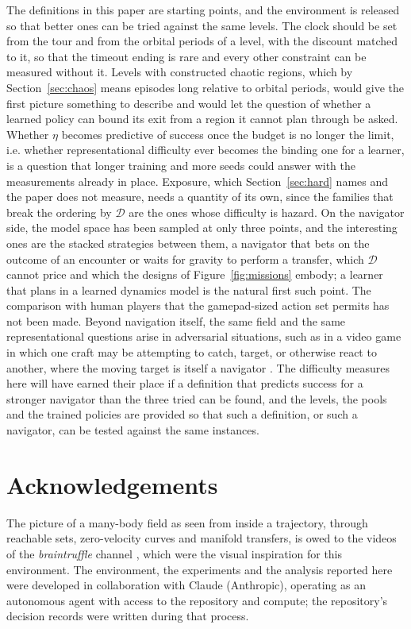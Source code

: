 \documentclass[11pt]{article}
\newcommand{\dd}{\mathcal{D}}
\begin{document}
The definitions in this paper are starting points, and the environment is
released so that better ones can be tried against the same levels. The
clock should be set from the tour and from the orbital periods of a level,
with the discount matched to it, so that the timeout ending is rare and
every other constraint can be measured without it. Levels with
constructed chaotic regions, which by Section~\ref{sec:chaos} means episodes
long relative to orbital periods, would give the first picture something to
describe and would let the question of whether a learned policy can bound
its exit from a region it cannot plan through be asked. Whether $\eta$ becomes predictive of success once the budget is no longer
the limit, i.e. whether representational difficulty ever becomes the binding
one for a learner, is a question that longer training and more seeds could
answer with the measurements already in place. Exposure, which
Section~\ref{sec:hard} names and the paper does not measure, needs a
quantity of its own, since the families that break the ordering by $\dd$
are the ones whose difficulty is hazard. On the navigator side, the model
space has been sampled at only three points, and the interesting ones are
the stacked strategies between them, a navigator that bets on the outcome of
an encounter or waits for gravity to perform a transfer, which $\dd$ cannot
price and which the designs of Figure~\ref{fig:missions} embody; a learner
that plans in a learned dynamics model is the natural first such point. The comparison with human players that the gamepad-sized action set
permits has not been made. Beyond navigation itself, the same
field and the same representational questions arise in adversarial
situations, such as in a video game in which one craft may be attempting to
catch, target, or otherwise react to another, where the moving target is
itself a navigator \cite{mitchell2005,reif1994,dennis2020}. The difficulty measures here will have earned their place if a definition
that predicts success for a stronger navigator than the three tried can be
found, and the levels, the pools and the trained policies are provided so
that such a definition, or such a navigator, can be tested against the same
instances.

\section*{Acknowledgements}

The picture of a many-body field as seen from inside a trajectory, through
reachable sets, zero-velocity curves and manifold transfers, is owed to the
videos of the \emph{braintruffle} channel
\cite{braintruffle2024,braintruffle2024a,braintruffle2025}, which were the
visual inspiration for this environment. The environment, the experiments
and the analysis reported here were developed in collaboration with Claude
(Anthropic), operating as an autonomous agent with access to the repository
and compute; the repository's decision records were written during that
process.
\end{document}

